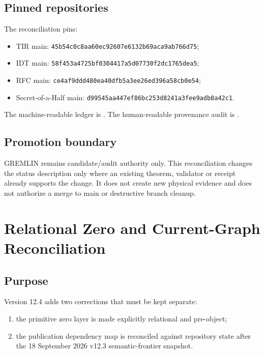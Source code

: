 \section{Pinned repositories}

The reconciliation pins:
\begin{itemize}
\item TIR main: \texttt{45b54c0c8aa60ec92607e6132b69aca9ab766d75};
\item IDT main: \texttt{58f453a4725bf0304417a5d07730f2dc1765dea5};
\item RFC main: \texttt{ce4af9ddd480ea40dfb5a3ee26ed396a58cb0e54};
\item Secret-of-a-Half main:
      \texttt{d99545aa447ef86bc253d8241a3fee9adb8a42c1}.
\end{itemize}

The machine-readable ledger is
.
The human-readable provenance audit is
.

\section{Promotion boundary}

GREMLIN remains candidate/audit authority only. This reconciliation changes the
status description only where an existing theorem, validator or receipt already
supports the change. It does not create new physical evidence and does not
authorize a merge to main or destructive branch cleanup.

\clearpage

\chapter{Relational Zero and Current-Graph Reconciliation}
\label{app:v12_relational_zero_graph_reconciliation}

\section{Purpose}

Version 12.4 adds two corrections that must be kept separate:

\begin{enumerate}
\item the primitive zero layer is made explicitly relational and pre-object;
\item the publication dependency map is reconciled against repository state after the
18 September 2026 v12.3 semantic-frontier snapshot.
\end{enumerate}

